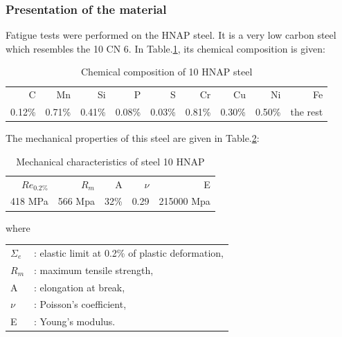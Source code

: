 \documentclass[3p,times,number,review]{elsarticle}
\begin{document}
\subsubsection{Presentation of the material}
Fatigue tests were performed on the HNAP steel. It is a very low carbon steel
which resembles the 10 CN 6. In Table.\ref{tab.10HNAPchem}, its chemical composition is given:	
	\begin{table}[!h]
		\centering
		\begin{tabular}{rrrrrrrrr}
			\hline
			C      & Mn     & Si     & P      & S      & Cr     & Cu     & Ni     & Fe       \\
			0.12\% & 0.71\% & 0.41\% & 0.08\% & 0.03\% & 0.81\% & 0.30\% & 0.50\% & the rest \\ \hline
		\end{tabular}
		\caption{Chemical composition of 10 HNAP steel\cite{Bedkowski1994}}
		\label{tab.10HNAPchem}
	\end{table}
The mechanical properties of this steel are given in Table.\ref{tab.10HNAPmec}:
\begin{table}[!h]
	\centering
	\begin{tabular}{rrrrr}
		\hline
		$Re_{0.2\%}$ & $R_m$   & A    & $\nu$ & E          \\
			418 MPa     & 566 Mpa & 32\% & 0.29  & 215000 Mpa \\ \hline
			\end{tabular}
			\caption{Mechanical characteristics of steel 10 HNAP\cite{Bedkowski_1994}}
			\label{tab.10HNAPmec}
			\end{table}
		
where 
\begin{table}[!h]
	\centering
	\begin{tabular}{ll}
		$\Sigma_e$ & : elastic limit at 0.2\% of plastic deformation, \\
		$R_m$      & : maximum tensile strength,                                                                  \\
		A          & : elongation at break,                                                                       \\
		$\nu$      & : Poisson's coefficient,                                                                     \\
		E          & : Young's modulus.                                                                          
	\end{tabular}
\end{table}
\end{document}
